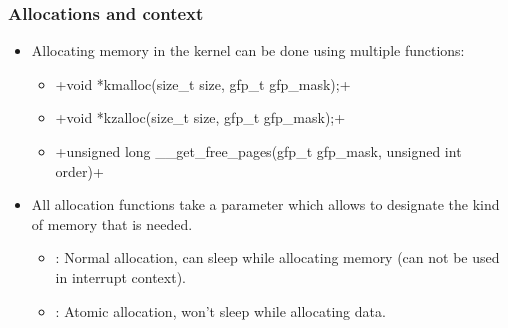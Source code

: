 \begin{frame}
  \frametitle{Allocations and context}
  \begin{itemize}
    \item Allocating memory in the kernel can be done using multiple functions:
    \begin{itemize}
      \item {}+void *kmalloc(size_t size, gfp_t gfp_mask);+
      \item {}+void *kzalloc(size_t size, gfp_t gfp_mask);+
      \item {}+unsigned long __get_free_pages(gfp_t gfp_mask, unsigned int order)+
    \end{itemize}
    \item All allocation functions take a  parameter which allows to
          designate the kind of memory that is needed.
    \begin{itemize}
      \item {}: Normal allocation, can sleep while allocating
            memory (can not be used in interrupt context).
      \item {}: Atomic allocation, won't sleep while allocating
            data.
    \end{itemize}
  \end{itemize}
\end{frame}


